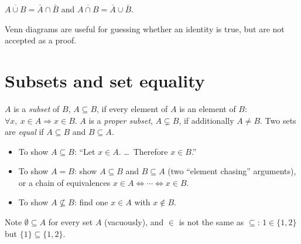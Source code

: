 \begin{theorem}
$\overline{A \cup B} = \bar A \cap \bar B$ and $\overline{A \cap B} = \bar A \cup \bar B$.
\end{theorem}

\begin{aside}
Venn diagrams are useful for guessing whether an identity is true, but are not accepted as a
proof.
\end{aside}

\begin{center}
\end{center}

\section{Subsets and set equality}

\begin{definition}
$A$ is a \emph{subset} of $B$, $A \subseteq B$, if every element of $A$ is an element of $B$:
$\forall x,\ x \in A \Rightarrow x \in B$. $A$ is a \emph{proper subset}, $A \subsetneq B$, if
additionally $A \ne B$. Two sets are \emph{equal} if $A \subseteq B$ and $B \subseteq A$.
\end{definition}

\begin{important}[Templates]
\begin{itemize}
  \item To show $A \subseteq B$: ``Let $x \in A$. \dots\ Therefore $x \in B$.''
  \item To show $A = B$: show $A \subseteq B$ and $B \subseteq A$ (two ``element chasing''
        arguments), or a chain of equivalences $x \in A \iff \cdots \iff x \in B$.
  \item To show $A \not\subseteq B$: find one $x \in A$ with $x \notin B$.
\end{itemize}
\end{important}

Note $\emptyset \subseteq A$ for every set $A$ (vacuously), and $\in$ is not the same as
$\subseteq$: $1 \in \{1,2\}$ but $\{1\} \subseteq \{1,2\}$.

